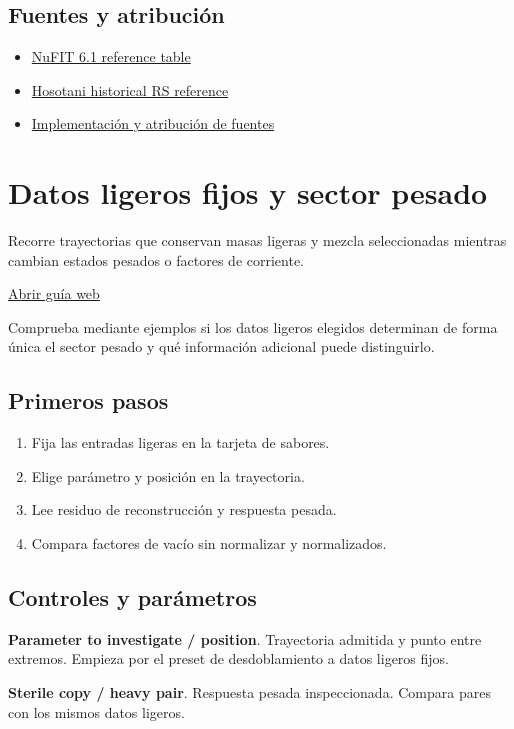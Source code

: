 \documentclass[11pt,a4paper]{article}
\begin{document}
\subsection*{Fuentes y atribución}
\begin{itemize}
\item \href{https://www.nu-fit.org/sites/default/files/v61.tbl-parameters.pdf}{NuFIT 6.1 reference table}
\item \href{https://arxiv.org/abs/2507.08321}{Hosotani historical RS reference}
\item \href{https://github.com/karlesmarin/ghu-lab/blob/main/src/modules/neutrino_flavour.mjs}{Implementación y atribución de fuentes}
\end{itemize}
\section{Datos ligeros fijos y sector pesado}
Recorre trayectorias que conservan masas ligeras y mezcla seleccionadas mientras cambian estados pesados o factores de corriente.

\href{https://karlesmarin.github.io/ghu-explorer/guide/es/identifiability/index.html}{Abrir guía web}

Comprueba mediante ejemplos si los datos ligeros elegidos determinan de forma única el sector pesado y qué información adicional puede distinguirlo.
\subsection*{Primeros pasos}
\begin{enumerate}
\item Fija las entradas ligeras en la tarjeta de sabores.
\item Elige parámetro y posición en la trayectoria.
\item Lee residuo de reconstrucción y respuesta pesada.
\item Compara factores de vacío sin normalizar y normalizados.
\end{enumerate}
\subsection*{Controles y parámetros}
\textbf{Parameter to investigate / position}. Trayectoria admitida y punto entre extremos. Empieza por el preset de desdoblamiento a datos ligeros fijos.

\textbf{Sterile copy / heavy pair}. Respuesta pesada inspeccionada. Compara pares con los mismos datos ligeros.
\end{document}
